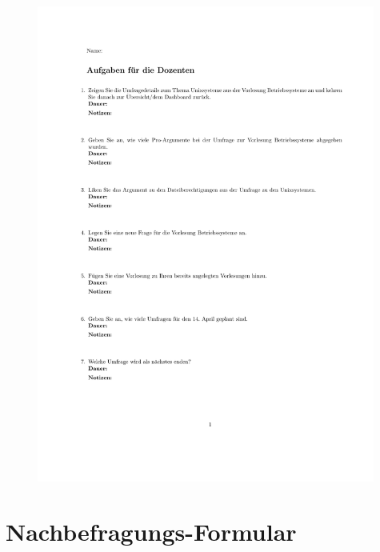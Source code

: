 \begin{figure}
  \vspace{-20pt}
  \begin{center}
    \includegraphics[page=4,width=0.99\textwidth]{./images/probetests}
  \end{center}
  \vspace{-40pt}
\end{figure}

\clearpage
\section{Nachbefragungs-Formular}
\label{sec:nachbefragung}



